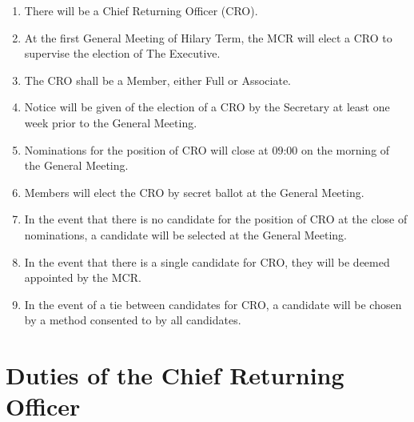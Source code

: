 \documentclass[11pt, a4paper]{article}
\begin{document}
\begin{enumerate}
	\item There will be a Chief Returning Officer (CRO).
    \item At the first General Meeting of Hilary Term, the MCR will elect a CRO to supervise the election of The Executive.
    \item The CRO shall be a Member, either Full or Associate.
    \item Notice will be given of the election of a CRO by the Secretary at least one week prior to the General Meeting.
    \item Nominations for the position of CRO will close at 09:00 on the morning of the General Meeting.
    \item Members will elect the CRO by secret ballot at the General Meeting.
    \item In the event that there is no candidate for the position of CRO at the close of nominations, a candidate will be selected at the General Meeting.
    \item In the event that there is a single candidate for CRO, they will be deemed appointed by the MCR.
    \item In the event of a tie between candidates for CRO, a candidate will be chosen by a method consented to by all candidates.
\end{enumerate}





\section{Duties of the Chief Returning Officer}
\label{sec:cro_duties}
\end{document}
